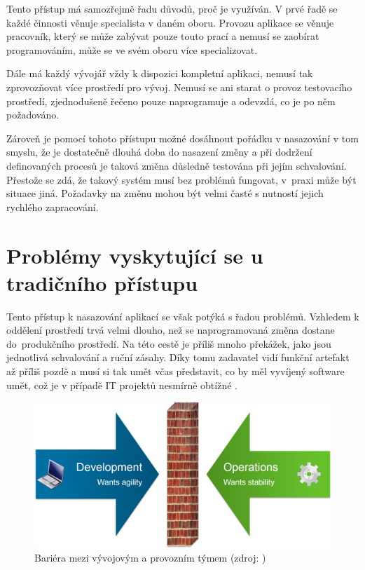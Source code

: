 \documentclass[FM,DP]{tulthesis}
\begin{document}
Tento přístup má samozřejmě řadu důvodů, proč je využíván. V prvé řadě se každé činnosti věnuje
specialista v daném oboru. Provozu aplikace se věnuje pracovník, který se může zabývat pouze
touto prací a nemusí se zaobírat programováním, může se ve svém oboru více specializovat.

Dále má každý vývojář vždy k dispozici kompletní aplikaci, nemusí tak zprovozňovat více prostředí pro 
vývoj. Nemusí se ani starat o provoz testovacího prostředí, zjednodušeně řečeno pouze naprogramuje
a odevzdá, co je po něm požadováno.

Zároveň je pomocí tohoto přístupu možné dosáhnout pořádku v nasazování v tom smyslu, že je dostatečně 
dlouhá doba do nasazení změny a při dodržení definovaných procesů je taková změna důsledně testována
při jejím schvalování. Přestože se zdá, že takový systém musí bez problémů fungovat, v~praxi může být
situace jiná. Požadavky na změnu mohou být velmi časté s nutností jejich rychlého zapracování.


\section{Problémy vyskytující se u tradičního přístupu}

Tento přístup k nasazování aplikací se však potýká s řadou problémů. Vzhledem k oddělení prostředí
trvá velmi dlouho, než se naprogramovaná změna dostane do~produkčního prostředí. Na této cestě
je příliš mnoho překážek, jako jsou jednotlivá schvalování a ruční zásahy. Díky tomu zadavatel vidí
funkční artefakt až příliš pozdě a musí si tak umět včas představit, co by měl vyvíjený software
umět, což je v případě IT projektů nesmírně obtížné \cite[strana~73]{devops}.

\begin{figure}[h]
\center
\includegraphics[width=\textwidth]{devops-wall.png}
\caption{Bariéra mezi vývojovým a provozním týmem (zdroj: \cite{devops-wall})}
\label{devops-wall}
\end{figure}
\end{document}
